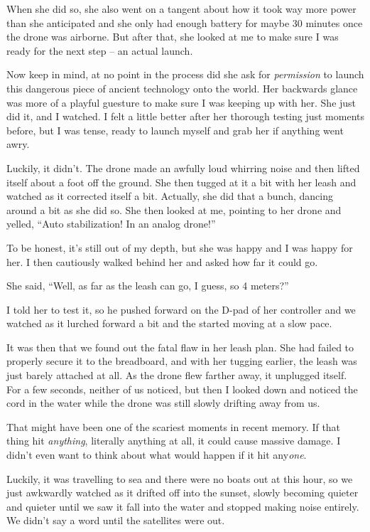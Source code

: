 When she did so, she also went on a tangent about how it took way more power than she anticipated and she only had enough battery for maybe 30 minutes once the drone was airborne.
But after that, she looked at me to make sure I was ready for the next step -- an actual launch.

Now keep in mind, at no point in the process did she ask for \textit{permission} to launch this dangerous piece of ancient technology onto the world.
Her backwards glance was more of a playful guesture to make sure I was keeping up with her.
She just did it, and I watched.
I felt a little better after her thorough testing just moments before, but I was tense, ready to launch myself and grab her if anything went awry.

Luckily, it didn't.
The drone made an awfully loud whirring noise and then lifted itself about a foot off the ground.
She then tugged at it a bit with her leash and watched as it corrected itself a bit.
Actually, she did that a bunch, dancing around a bit as she did so.
She then looked at me, pointing to her drone and yelled, ``Auto stabilization! In an analog drone!''

To be honest, it's still out of my depth, but she was happy and I was happy for her.
I then cautiously walked behind her and asked how far it could go.

She said, ``Well, as far as the leash can go, I guess, so 4 meters?''

I told her to test it, so he pushed forward on the D-pad of her controller and we watched as it lurched forward a bit and the started moving at a slow pace.

It was then that we found out the fatal flaw in her leash plan.
She had failed to properly secure it to the breadboard, and with her tugging earlier, the leash was just barely attached at all.
As the drone flew farther away, it unplugged itself.
For a few seconds, neither of us noticed, but then I looked down and noticed the cord in the water while the drone was still slowly drifting away from us.

That might have been one of the scariest moments in recent memory.
If that thing hit \textit{anything}, literally anything at all, it could cause massive damage.
I didn't even want to think about what would happen if it hit any\textit{one}.

Luckily, it was travelling to sea and there were no boats out at this hour, so we just awkwardly watched as it drifted off into the sunset, slowly becoming quieter and quieter until we saw it fall into the water and stopped making noise entirely.
We didn't say a word until the satellites were out.

